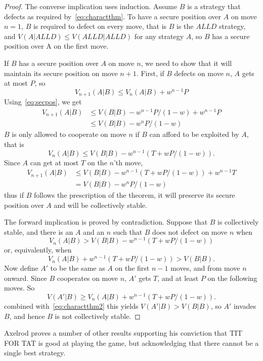 \begin{proof}
The converse implication uses induction. Assume $B$ is a strategy that defects as required by~\ref{eq:charactthm}. To have a secure position over $A$ on move $n=1$, $B$ is required to defect on every move, that is $B$ is the $ALLD$ strategy, and $V(A | ALLD) \leq V(ALLD | ALLD)$ for any strategy $A$, so $B$ has a secure position over A on the first move.

If $B$ has a secure position over $A$ on move $n$, we need to show that it will maintain its secure position on move $n+1$. First, if $B$ defects on move $n$, $A$ gets at most $P$, so
\[
V_{n+1}(A|B) \leq V_n(A|B) + w^{n-1}P
\]
Using~\ref{eq:secpos}, we get
\begin{align*}
V_{n+1}(A|B) 
&\leq V(B|B) - w^{n-1}P/(1-w) + w^{n-1}P \\
&\leq V(B|B) - w^{n}P/(1-w)
\end{align*}
$B$ is only allowed to cooperate on move $n$ if $B$ can afford to be exploited by $A$, that is
\[
V_n (A | B) \leq V(B | B) - w^{n-1}(T + wP/(1-w)).
\]
Since $A$ can get at most $T$ on the $n$'th move,
\begin{align*}
V_{n+1} (A | B)
&\leq V(B | B) - w^{n-1} (T + wP/(1-w)) + w^{n-1}T \\
&= V(B | B) - w^n P / (1-w)
\end{align*}
thus if $B$ follows the prescription of the theorem, it will preserve its secure position over $A$ and will be collectively stable.

The forward implication is proved by contradiction. Suppose that $B$ is collectively stable, and there is an $A$ and an $n$ such that $B$ does not defect on move $n$ when
\[
V_n (A | B) > V(B | B) - w^{n-1}(T + wP / (1-w))
\]
or, equivalently, when
\begin{equation}\label{eq:charactthm2}
V_n (A | B) + w^{n-1}(T + wP / (1-w)) > V(B | B).
\end{equation}
Now define $A'$ to be the same as $A$ on the first $n-1$ moves, and from move $n$ onward. Since $B$ cooperates on move $n$, $A'$ gets $T$, and at least $P$ on the following moves. So
\[
V(A'|B) \geq V_n (A | B) + w^{n-1}(T + wP/(1-w)).
\]
combined with~\ref{eq:charactthm2} this yields $V(A' | B) > V(B | B)$, so $A'$ invades $B$, and hence $B$ is not collectively stable.
\end{proof}

Axelrod proves a number of other results supporting his conviction that TIT FOR TAT is good at playing the game, but acknowledging that there cannot be a single best strategy.

